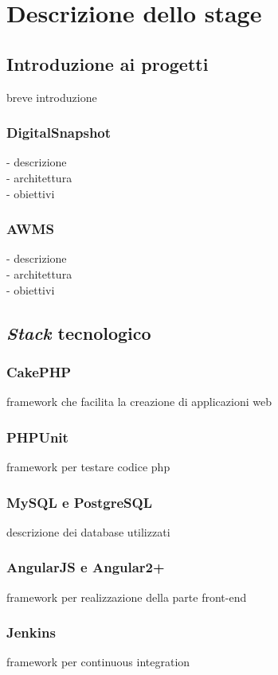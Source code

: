 \newpage
\chapter{Descrizione dello stage}
\label{cap:descrizione-stage}

\section{Introduzione ai progetti}
breve introduzione
\subsection{DigitalSnapshot}
- descrizione\\
- architettura\\
- obiettivi\\
\subsection{AWMS}
- descrizione\\
- architettura\\
- obiettivi\\
\section{\textit{Stack} tecnologico}
\subsection{CakePHP}
framework che facilita la creazione di applicazioni web
\subsection{PHPUnit}
framework per testare codice php
\subsection{MySQL e PostgreSQL}
descrizione dei database utilizzati
\subsection{AngularJS e Angular2+}
framework per realizzazione della parte front-end
\subsection{Jenkins}
framework per continuous integration
